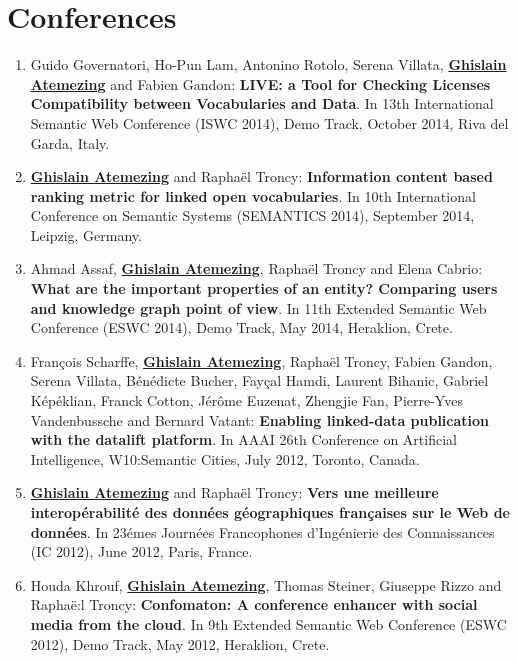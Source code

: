 \section*{Conferences}\label{sec:conf}
\begin{enumerate}
 \item {G}uido {G}overnatori, {H}o-{P}un {L}am, {A}ntonino {R}otolo, {S}erena {V}illata, \underline{\textbf{{G}hislain {A}temezing}} and {F}abien {G}andon: \textbf{LIVE: a Tool for Checking Licenses Compatibility between Vocabularies and Data}. In 13th International Semantic Web Conference (ISWC 2014), Demo Track, {O}ctober 2014, {R}iva del {G}arda, {I}taly.

 \item \underline{\textbf{Ghislain Atemezing}} and Rapha{\"e}l Troncy: \textbf{{I}nformation content based ranking metric for linked open vocabularies}. In 10th {I}nternational {C}onference on {S}emantic {S}ystems (SEMANTICS 2014), {S}eptember 2014, {L}eipzig, {G}ermany.

 \item {A}hmad {A}ssaf, \underline{\textbf{Ghislain Atemezing}}, {R}apha{\"e}l {T}roncy and {E}lena {C}abrio: \textbf{{W}hat are the important properties of an entity? {C}omparing users and knowledge graph point of view}. In 11th {E}xtended {S}emantic {W}eb {C}onference (ESWC 2014), Demo Track, May 2014, {H}eraklion, {C}rete.

  \item Fran\c cois Scharffe, \underline{\textbf{Ghislain Atemezing}}, Rapha\"{e}l Troncy, Fabien Gandon, Serena Villata, B\'{e}n\'{e}dicte Bucher, Fay\c cal Hamdi, Laurent Bihanic, Gabriel K\'{e}p\'{e}klian, Franck Cotton, J\'{e}r\^{o}me Euzenat, Zhengjie Fan, Pierre-Yves Vandenbussche and Bernard Vatant: \textbf{Enabling linked-data publication with the datalift platform}. In AAAI 26th Conference on Artificial Intelligence, W10:Semantic Cities, July 2012, Toronto, Canada.

 \item \underline{\textbf{Ghislain Atemezing}} and Rapha\"{e}l Troncy: \textbf{Vers une meilleure interop\'{e}rabilit\'{e} des donn\'{e}es g\'{e}ographiques fran\c caises sur le Web de donn\'{e}es}. In 23\'{e}mes Journ\'{e}es Francophones d'Ing\'{e}nierie des Connaissances (IC 2012), June 2012, Paris, France.

 \item Houda Khrouf, \underline{\textbf{Ghislain Atemezing}}, Thomas Steiner, Giuseppe Rizzo and Rapha\"{e}:l Troncy: \textbf{Confomaton: A conference enhancer with social media from the cloud}. In 9th Extended Semantic Web Conference (ESWC 2012), Demo Track, May 2012, Heraklion, Crete.
\end{enumerate}

